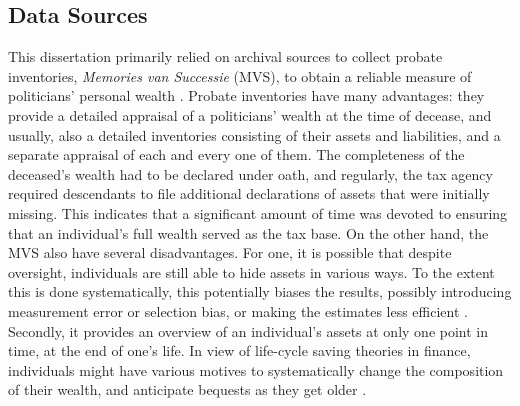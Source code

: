 \subsection{Data Sources}
This dissertation primarily relied on archival sources to collect probate inventories, \textit{Memories van Successie} (MVS), to obtain a reliable measure of politicians' personal wealth \citep{bos1990vermogensbezitters}. Probate inventories have many advantages: they provide a detailed appraisal of a politicians' wealth at the time of decease, and usually, also a detailed inventories consisting of their assets and liabilities, and a separate appraisal of each and every one of them. The completeness of the deceased's wealth had to be declared under oath, and regularly, the tax agency required descendants to file additional declarations of assets that were initially missing. This indicates that a significant amount of time was devoted to ensuring that an individual's full wealth served as the tax base. On the other hand, the MVS also have several disadvantages. For one, it is possible that despite oversight, individuals are still able to hide assets in various ways. To the extent this is done systematically, this potentially biases the results, possibly introducing measurement error or selection bias, or making the estimates less efficient \citep{angrist2008mostly}. Secondly, it provides an overview of an individual's assets at only one point in time, at the end of one's life. In view of life-cycle saving theories in finance, individuals might have various motives to systematically change the composition of their wealth, and anticipate bequests as they get older \citep{dynan2002importance}. 

